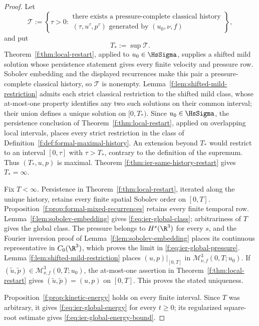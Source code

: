 \begin{proof}
 Let
 \[
  \mathscr T:=\left\{\tau>0:
  \begin{array}{c}
  \text{there exists a pressure-complete classical history}\\
  (\tau,u^\tau,p^\tau)\text{ generated by }(u_0,\nu,f)
  \end{array}
  \right\},
 \]
 and put
\[
 T_*:=\sup\mathscr T.
\]
 Theorem~\ref{f:thm:local-restart}, applied to \(u_0\in\HsSigma\), supplies a
 shifted mild solution whose persistence statement gives every finite
 velocity and pressure row.  Sobolev embedding and the displayed recurrences
 make this pair a pressure-complete classical history, so \(\mathscr T\) is
 nonempty.
 Lemma~\ref{f:lem:shifted-mild-restriction} admits each strict classical
restriction to the shifted mild class, whose at-most-one property identifies
any two such solutions on their common interval; their union defines a unique
 solution on \([0,T_*)\).  Since \(u_0\in\HsSigma\), the persistence conclusion
of Theorem~\ref{f:thm:local-restart}, applied on overlapping local intervals,
places every strict restriction in the class of
Definition~\ref{f:def:formal-maximal-history}.  An extension beyond \(T_*\)
 would restrict to an interval \([0,\tau]\) with \(\tau>T_*\), contrary to
 the definition of the supremum.  Thus \((T_*,u,p)\) is maximal.  Theorem
\ref{f:thm:ier-same-history-restart} gives \(T_*=\infty\).

Fix \(T<\infty\).  Persistence in Theorem~\ref{f:thm:local-restart}, iterated
along the unique history, retains every finite spatial Sobolev order on
\([0,T]\).  Proposition~\ref{f:prop:formal-mixed-recurrences} retains every
finite temporal row.  Lemma~\ref{f:lem:sobolev-embedding} gives
\eqref{f:eq:ier-global-class}; arbitrariness of \(T\) gives the global class.
The pressure belongs to \(H^s(\R^3)\) for every \(s\), and the Fourier
inversion proof of Lemma~\ref{f:lem:sobolev-embedding} places its continuous
representative in \(C_0(\R^3)\), which proves the limit in
\eqref{f:eq:ier-global-pressure}.  Lemma
\ref{f:lem:shifted-mild-restriction} places \((u,p)|_{[0,T]}\) in
\(\mathscr M_{\nu,f}^3(0,T;u_0)\).  If
\((\widetilde u,\widetilde p)\in\mathscr M_{\nu,f}^3(0,T;u_0)\), the at-most-one
assertion in Theorem~\ref{f:thm:local-restart} gives
\((\widetilde u,\widetilde p)=(u,p)\) on \([0,T]\).  This proves the stated
uniqueness.

Proposition~\ref{f:prop:kinetic-energy} holds on every finite interval.  Since
\(T\) was arbitrary, it gives \eqref{f:eq:ier-global-energy} for every
\(t\ge0\); its regularized square-root estimate gives
\eqref{f:eq:ier-global-energy-bound}.
\end{proof}
